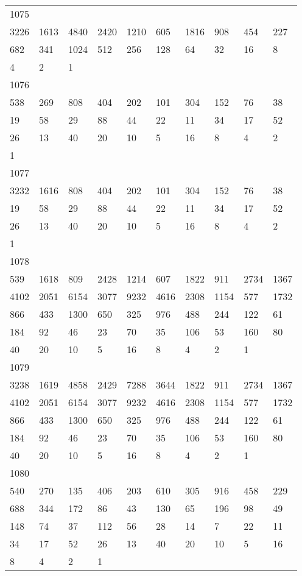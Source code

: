 \begin{longtable}{*{10}{l}}
1075&&&&&&&&&\\
3226& 1613& 4840& 2420& 1210& 605& 1816& 908& 454& 227\\
682& 341& 1024& 512& 256& 128& 64& 32& 16& 8\\
4& 2& 1& \\

1076&&&&&&&&&\\
538& 269& 808& 404& 202& 101& 304& 152& 76& 38\\
19& 58& 29& 88& 44& 22& 11& 34& 17& 52\\
26& 13& 40& 20& 10& 5& 16& 8& 4& 2\\
1& \\

1077&&&&&&&&&\\
3232& 1616& 808& 404& 202& 101& 304& 152& 76& 38\\
19& 58& 29& 88& 44& 22& 11& 34& 17& 52\\
26& 13& 40& 20& 10& 5& 16& 8& 4& 2\\
1& \\

1078&&&&&&&&&\\
539& 1618& 809& 2428& 1214& 607& 1822& 911& 2734& 1367\\
4102& 2051& 6154& 3077& 9232& 4616& 2308& 1154& 577& 1732\\
866& 433& 1300& 650& 325& 976& 488& 244& 122& 61\\
184& 92& 46& 23& 70& 35& 106& 53& 160& 80\\
40& 20& 10& 5& 16& 8& 4& 2& 1& \\

1079&&&&&&&&&\\
3238& 1619& 4858& 2429& 7288& 3644& 1822& 911& 2734& 1367\\
4102& 2051& 6154& 3077& 9232& 4616& 2308& 1154& 577& 1732\\
866& 433& 1300& 650& 325& 976& 488& 244& 122& 61\\
184& 92& 46& 23& 70& 35& 106& 53& 160& 80\\
40& 20& 10& 5& 16& 8& 4& 2& 1& \\

1080&&&&&&&&&\\
540& 270& 135& 406& 203& 610& 305& 916& 458& 229\\
688& 344& 172& 86& 43& 130& 65& 196& 98& 49\\
148& 74& 37& 112& 56& 28& 14& 7& 22& 11\\
34& 17& 52& 26& 13& 40& 20& 10& 5& 16\\
8& 4& 2& 1& \\


\end{longtable}
